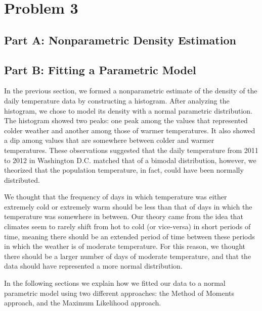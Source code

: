 \documentclass[11pt]{article}
\begin{document}
\section{Problem 3}
\label{sec:problem3}
\subsection{Part A: Nonparametric Density Estimation}
\label{subsec:3a}


\subsection{Part B: Fitting a Parametric Model}
\label{subsec:3b}
In the previous section, we formed a nonparametric estimate of the density of the daily temperature data by constructing a histogram. After analyzing the histogram, we chose to model its density with a normal parametric distribution. The histogram showed two peaks: one peak among the values that represented colder weather and another among those of warmer temperatures. It also showed a dip among values that are somewhere between colder and warmer temperatures. These observations suggested that the daily temperature from 2011 to 2012 in Washington D.C. matched that of a bimodal distribution, however, we theorized that the population temperature, in fact, could have been normally distributed.  

We thought that the frequency of days in which temperature was either extremely cold or extremely warm should be less than that of days in which the temperature was somewhere in between. Our theory came from the idea that climates seem to rarely shift from hot to cold (or vice-versa) in short periods of time, meaning there should be an extended period of time between these periods in which the weather is of moderate temperature. For this reason, we thought there should be a larger number of days of moderate temperature, and that the data should have represented a more normal distribution. 

In the following sections we explain how we fitted our data to a normal parametric model using two different approaches: the Method of Moments approach, and the Maximum Likelihood approach. 
\end{document}
